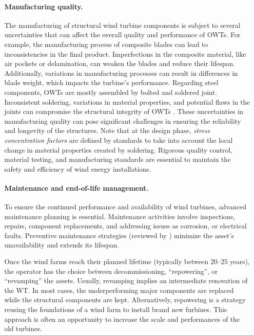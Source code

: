 \paragraph{Manufacturing quality.}
The manufacturing of structural wind turbine components is subject to several uncertainties that can affect the overall quality and performance of OWTs. 
For example, the manufacturing process of composite blades can lead to inconsistencies in the final product. 
Imperfections in the composite material, like air pockets or delamination, can weaken the blades and reduce their lifespan. 
Additionally, variations in manufacturing processes can result in differences in blade weight, which impacts the turbine's performance. 
Regarding steel components, OWTs are mostly assembled by bolted and soldered joint. 
Inconsistent soldering, variations in material properties, and potential flaws in the joints can compromise the structural integrity of OWTs \citep{veers_2019_review}. 
These uncertainties in manufacturing quality can pose significant challenges in ensuring the reliability and longevity of the structures. 
Note that at the design phase, \textit{stress concentration factors} are defined by standards to take into account the local change in material properties created by soldering. 
Rigorous quality control, material testing, and manufacturing standards are essential to maintain the safety and efficiency of wind energy installations. 


\paragraph{Maintenance and end-of-life management.}

To ensure the continued performance and availability of wind turbines, advanced maintenance planning is essential. 
Maintenance activities involve inspections, repairs, component replacements, and addressing issues as corrosion, or electrical faults. 
Preventive maintenance strategies (reviewed by \citet{ren_2021_owt_maintenance}) minimize the asset's unavailability and extends its lifespan. 

Once the wind farms reach their planned lifetime (typically between 20--25 years), the operator has the choice between decommissioning, ``repowering'', or ``revamping'' the assets. 
Usually, revamping implies an intermediate renovation of the WT. 
In most cases, the underperforming major components are replaced while the structural components are kept. 
Alternatively, repowering is a strategy reusing the foundations of a wind farm to install brand new furbines. 
This approach is often an opportunity to increase the scale and performances of the old turbines. 

